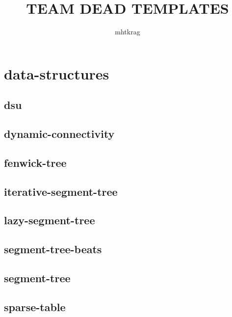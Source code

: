 \documentclass[a4paper, twocolumn]{article}
\title{TEAM DEAD TEMPLATES}
\author{mhtkrag}
\begin{document}
\begin{titlepage}
\maketitle
\thispagestyle{empty}
\pagebreak
\pagestyle{fancy}
\lhead{}
\rhead{}
\cfoot{}
\tableofcontents
\end{titlepage}

\pagestyle{fancy}
\cfoot{- \thepage \ -}
  
\section{data-structures}
\subsection{dsu}

\subsection{dynamic-connectivity}

\subsection{fenwick-tree}

\subsection{iterative-segment-tree}

\subsection{lazy-segment-tree}

\subsection{segment-tree-beats}

\subsection{segment-tree}

\subsection{sparse-table}

\end{document}
